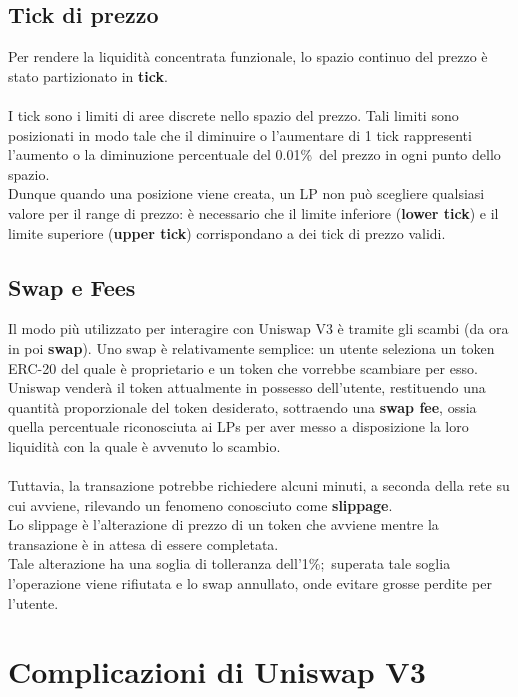 \documentclass[12pt,a4paper]{report}
\begin{document}
\subsection{Tick di prezzo}

Per rendere la liquidità concentrata funzionale, lo spazio continuo del prezzo è stato partizionato in \textbf{tick}.
\\\\I tick sono i limiti di aree discrete nello spazio del prezzo. Tali limiti sono posizionati in modo tale che il diminuire o l'aumentare di 1 tick rappresenti l'aumento o la diminuzione percentuale del 0.01\%\ del prezzo in ogni punto dello spazio.
\\Dunque quando una posizione viene creata, un LP non può scegliere qualsiasi valore per il range di prezzo: è necessario che il limite inferiore (\textbf{lower tick}) e il limite superiore (\textbf{upper tick}) corrispondano a dei tick di prezzo validi.

\subsection{Swap e Fees}

Il modo più utilizzato per interagire con Uniswap V3 è tramite gli scambi (da ora in poi \textbf{swap}).
Uno swap è relativamente semplice: un utente seleziona un token ERC-20 del quale è proprietario e un token che vorrebbe scambiare per esso. Uniswap venderà il token attualmente in possesso dell'utente, restituendo una quantità proporzionale del token desiderato, sottraendo una \textbf{swap fee}, ossia quella percentuale riconosciuta ai LPs per aver messo a disposizione la loro liquidità con la quale è avvenuto lo scambio.
\\\\Tuttavia, la transazione potrebbe richiedere alcuni minuti, a seconda della rete su cui avviene, rilevando un fenomeno conosciuto come \textbf{slippage}.
\\Lo slippage è l'alterazione di prezzo di un token che avviene mentre la transazione è in attesa di essere completata.\\Tale alterazione ha una soglia di tolleranza dell'1\%;\ superata tale soglia l'operazione viene rifiutata e lo swap annullato, onde evitare grosse perdite per l'utente.

\section{Complicazioni di Uniswap V3}
\end{document}
